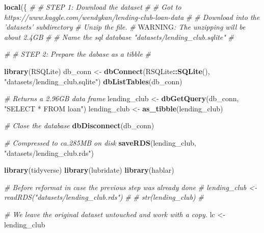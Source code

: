\documentclass[11pt,]{report}
\newenvironment{Shaded}{\begin{snugshade}}{\end{snugshade}}
\newcommand{\AlertTok}[1]{\textcolor[rgb]{0.94,0.16,0.16}{#1}}
\newcommand{\CommentTok}[1]{\textcolor[rgb]{0.56,0.35,0.01}{\textit{#1}}}
\newcommand{\KeywordTok}[1]{\textcolor[rgb]{0.13,0.29,0.53}{\textbf{#1}}}
\newcommand{\NormalTok}[1]{#1}
\newcommand{\OperatorTok}[1]{\textcolor[rgb]{0.81,0.36,0.00}{\textbf{#1}}}
\newcommand{\StringTok}[1]{\textcolor[rgb]{0.31,0.60,0.02}{#1}}
\begin{document}
\begin{Shaded}
\begin{Highlighting}[numbers=left,,]
\KeywordTok{local}\NormalTok{(\{}
  \CommentTok{#}
  \CommentTok{# STEP 1: Download the dataset}
  \CommentTok{#}
  \CommentTok{#   Got to https://www.kaggle.com/wendykan/lending-club-loan-data}
  \CommentTok{#}
  \CommentTok{#   Download into the 'datasets' subdirectory}
  \CommentTok{#   Unzip the file.}
  \CommentTok{#   }\AlertTok{WARNING}\CommentTok{: The unzipping will be about 2.4GB}
  \CommentTok{#}
  \CommentTok{#   Name the sql database "datasets/lending_club.sqlite"}
  \CommentTok{#}
  
  \CommentTok{#}
  \CommentTok{# STEP 2: Prepare the dabase as a tibble}
  \CommentTok{#}
  
  \KeywordTok{library}\NormalTok{(RSQLite)}
\NormalTok{  db_conn <-}
\StringTok{    }\KeywordTok{dbConnect}\NormalTok{(RSQLite}\OperatorTok{::}\KeywordTok{SQLite}\NormalTok{(), }\StringTok{"datasets/lending_club.sqlite"}\NormalTok{)}
  \KeywordTok{dbListTables}\NormalTok{(db_conn)}
  
  \CommentTok{# Returns a 2.96GB data frame}
\NormalTok{  lending_club <-}\StringTok{ }\KeywordTok{dbGetQuery}\NormalTok{(db_conn, }\StringTok{"SELECT * FROM loan"}\NormalTok{)}
\NormalTok{  lending_club <-}\StringTok{ }\KeywordTok{as_tibble}\NormalTok{(lending_club)}
  
  \CommentTok{# Close the database}
  \KeywordTok{dbDisconnect}\NormalTok{(db_conn)}
  
  \CommentTok{# Compressed to ca.285MB on disk}
  \KeywordTok{saveRDS}\NormalTok{(lending_club, }\StringTok{"datasets/lending_club.rds"}\NormalTok{)}
  
  
  \KeywordTok{library}\NormalTok{(tidyverse)}
  \KeywordTok{library}\NormalTok{(lubridate)}
  \KeywordTok{library}\NormalTok{(hablar)}
  
  \CommentTok{# Before reformat in case the previous step was already done}
  \CommentTok{# lending_club <- readRDS("datasets/lending_club.rds")}
  \CommentTok{#}
  \CommentTok{# str(lending_club)}
  \CommentTok{#}
  
  \CommentTok{# We leave the original dataset untouched and work with a copy.}
\NormalTok{  lc <-}\StringTok{ }\NormalTok{lending_club}
  

\end{Highlighting}
\end{Shaded}
\end{document}
